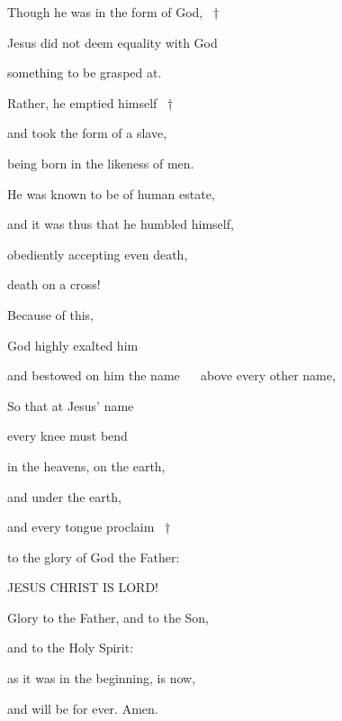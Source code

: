 \noindent Though he was in the form of God, ~†~\nopagebreak

Jesus did not deem equality with God ~\GreStar{}~\nopagebreak

something to be grasped at.

\noindent Rather, he emptied himself ~†~\nopagebreak

and took the form of a slave, ~\GreStar{}~\nopagebreak

being born in the likeness of men.

\noindent He was known to be of human estate, ~\GreStar{}~\nopagebreak

and it was thus that he humbled himself,

\noindent obediently accepting even death, ~\GreStar{}~\nopagebreak

death on a cross!

\noindent Because of this, ~\GreStar{}~\nopagebreak

God highly exalted him


\noindent and bestowed on him the name ~\GreStar{}~\nopagebreak
above every other name,

\noindent So that at Jesus’ name ~\GreStar{}~\nopagebreak

every knee must bend

\noindent in the heavens, on the earth, ~\GreStar{}~\nopagebreak

and under the earth,

\noindent and every tongue proclaim ~†~\nopagebreak

to the glory of God the Father: ~\GreStar{}~\nopagebreak

JESUS CHRIST IS LORD!

\noindent Glory to the Father, and to the Son,~\GreStar{}~\nopagebreak

and to the Holy Spirit:

\noindent as it was in the beginning, is now,~\GreStar{}~\nopagebreak

and will be for ever. Amen.

